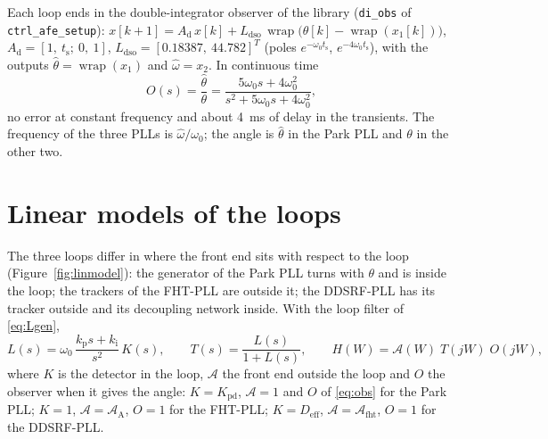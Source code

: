 \documentclass[11pt,a4paper]{scrartcl}
\newcommand{\ped}[1]{_{\mathrm{#1}}}
\newcommand{\code}[1]{\texttt{#1}}
\newcommand{\wrapop}{\operatorname{wrap}}
\begin{document}
\begin{onehalfspace}
Each loop ends in the double-integrator observer of the library (\code{di\_obs} of \code{ctrl\_afe\_setup}): $x[k+1] = A\ped{d}\,x[k] + L\ped{dso}\,\wrapop\big(\theta[k] - \wrapop(x_1[k])\big)$, $A\ped{d} = [1,\ t\ped{s};\ 0,\ 1]$, $L\ped{dso} = [0.18387,\ 44.782]^T$ (poles $e^{-\omega_0 t\ped{s}}$, $e^{-4\omega_0 t\ped{s}}$), with the outputs $\hat\theta = \wrapop(x_1)$ and $\hat\omega = x_2$. In continuous time
\begin{equation}
	O(s) = \frac{\hat\theta}{\theta} = \frac{5\omega_0 s + 4\omega_0^2}{s^2 + 5\omega_0 s + 4\omega_0^2},
	\label{eq:obs}
\end{equation}
no error at constant frequency and about \SI{4}{\milli\second} of delay in the transients. The frequency of the three PLLs is $\hat\omega/\omega_0$; the angle is $\hat\theta$ in the Park PLL and $\theta$ in the other two.

\section{Linear models of the loops}
\label{sec:models}

The three loops differ in where the front end sits with respect to the loop (Figure~\ref{fig:linmodel}): the generator of the Park PLL turns with $\theta$ and is inside the loop; the trackers of the FHT-PLL are outside it; the DDSRF-PLL has its tracker outside and its decoupling network inside. With the loop filter of \eqref{eq:Lgen},
\begin{equation}
	L(s) = \omega_0\,\frac{k\ped{p} s + k\ped{i}}{s^2}\, K(s), \qquad T(s) = \frac{L(s)}{1 + L(s)}, \qquad H(W) = \mathcal{A}(W)\; T(jW)\; O(jW),
	\label{eq:H}
\end{equation}
where $K$ is the detector in the loop, $\mathcal{A}$ the front end outside the loop and $O$ the observer when it gives the angle: $K = K\ped{pd}$, $\mathcal{A} = 1$ and $O$ of \eqref{eq:obs} for the Park PLL; $K = 1$, $\mathcal{A} = \mathcal{A}\ped{A}$, $O = 1$ for the FHT-PLL; $K = D\ped{eff}$, $\mathcal{A} = \mathcal{A}\ped{fht}$, $O = 1$ for the DDSRF-PLL.


\end{onehalfspace}
\end{document}
